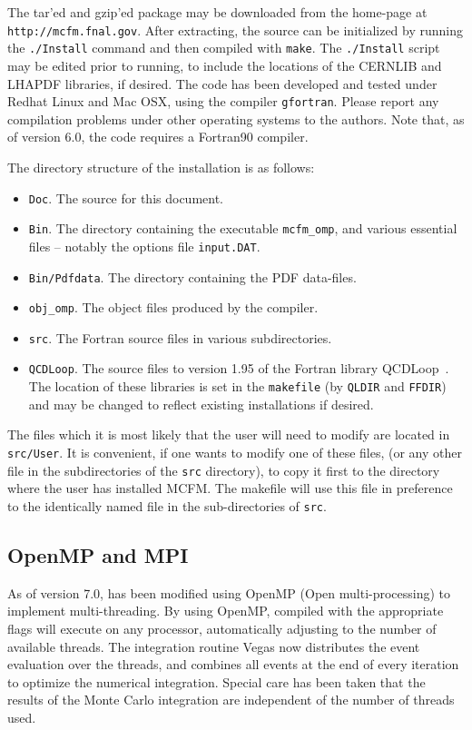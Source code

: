 \documentclass[12pt]{article}
\begin{document}
The tar'ed and gzip'ed package may be downloaded from
the \MCFM home-page at {\tt http://mcfm.fnal.gov}.
After extracting, the source can be initialized by running the
{\tt ./Install} command and then compiled with {\tt make}. The
{\tt ./Install} script may be edited prior to running, to include
the locations of the CERNLIB and LHAPDF libraries, if desired.
The code has been developed and tested under Redhat Linux and Mac OSX,
using the compiler {\tt gfortran}. Please report
any compilation problems under other operating systems to the authors.
Note that, as of version 6.0, the code requires a Fortran90 compiler.

The directory structure of the installation is as follows:
\begin{itemize}
\item {\tt Doc}. The source for this document.
\item {\tt Bin}. The directory containing the executable {\tt mcfm\_omp},
and various essential files -- notably the options file {\tt input.DAT}.
\item {\tt Bin/Pdfdata}. The directory containing the PDF data-files.
\item {\tt obj\_omp}. The object files produced by the compiler. 
\item {\tt src}. The Fortran source files in various subdirectories.
\item {\tt QCDLoop}. The source files to version 1.95 of the Fortran
library QCDLoop~\cite{Ellis:2007qk}. The location of these libraries
is set in the {\tt makefile} (by {\tt QLDIR} and {\tt FFDIR}) and may be
changed to reflect existing installations if desired. 
\end{itemize}
The files which it is most likely that the user will need to modify
are located in {\tt src/User}. It is convenient, if one wants to 
modify one of these files, (or any other file in the subdirectories of the 
{\tt src} directory),
to copy it first to the directory where the user has installed MCFM.
The makefile will use this file in preference to the identically named
file in the sub-directories of {\tt src}.
 
\subsection{OpenMP and MPI}
As of version 7.0, \MCFM has been modified 
using OpenMP (Open multi-processing)  to implement multi-threading. 
By using OpenMP, \MCFM compiled with the appropriate flags
will execute on any processor, 
automatically adjusting to the number of available threads.
The integration routine Vegas now distributes the event evaluation over the threads, 
and combines all events at the end of every iteration to
optimize the numerical integration.
Special care has been taken that the results of the
Monte Carlo integration are independent of the 
number of threads used.
\end{document}
